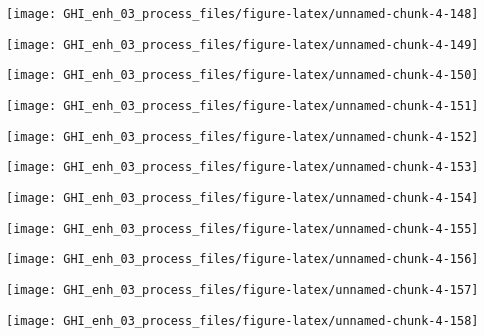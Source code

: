 \documentclass[
  10pt,
  a4paper,oneside]{article}
\begin{document}
\begin{center}\texttt{[image: GHI\_enh\_03\_process\_files/figure-latex/unnamed-chunk-4-148]} \end{center}

\begin{center}\texttt{[image: GHI\_enh\_03\_process\_files/figure-latex/unnamed-chunk-4-149]} \end{center}

\begin{center}\texttt{[image: GHI\_enh\_03\_process\_files/figure-latex/unnamed-chunk-4-150]} \end{center}

\begin{center}\texttt{[image: GHI\_enh\_03\_process\_files/figure-latex/unnamed-chunk-4-151]} \end{center}

\begin{center}\texttt{[image: GHI\_enh\_03\_process\_files/figure-latex/unnamed-chunk-4-152]} \end{center}

\begin{center}\texttt{[image: GHI\_enh\_03\_process\_files/figure-latex/unnamed-chunk-4-153]} \end{center}

\begin{center}\texttt{[image: GHI\_enh\_03\_process\_files/figure-latex/unnamed-chunk-4-154]} \end{center}

\begin{center}\texttt{[image: GHI\_enh\_03\_process\_files/figure-latex/unnamed-chunk-4-155]} \end{center}

\begin{center}\texttt{[image: GHI\_enh\_03\_process\_files/figure-latex/unnamed-chunk-4-156]} \end{center}

\begin{center}\texttt{[image: GHI\_enh\_03\_process\_files/figure-latex/unnamed-chunk-4-157]} \end{center}

\begin{center}\texttt{[image: GHI\_enh\_03\_process\_files/figure-latex/unnamed-chunk-4-158]} \end{center}
\end{document}

